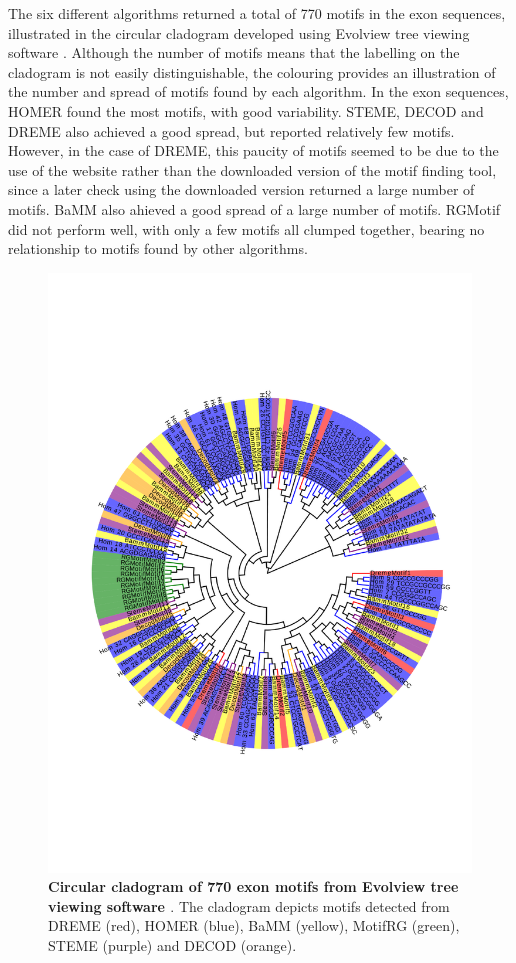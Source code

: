 \documentclass[12pt]{article}
\begin{document}
The six different algorithms returned a total of 770 motifs in the exon sequences, illustrated in the circular cladogram developed using Evolview tree viewing software  \citep{He2016}. Although the number of motifs means that the labelling on the cladogram is not easily distinguishable, the colouring provides an illustration of the number and spread of motifs found by each algorithm. In the exon sequences, HOMER found the most motifs, with good variability. STEME, DECOD and DREME also achieved a good spread, but reported relatively few motifs. However, in the case of DREME, this paucity of motifs seemed to be due to the use of the website rather than the downloaded version of the motif finding tool, since a later check using the downloaded version returned a large number of motifs. BaMM also ahieved a good spread of a large number of motifs. RGMotif did not perform well, with only a few motifs all clumped together, bearing no relationship to motifs found by other algorithms.

\begin{figure}[htbp] 
     \includegraphics[width= \textwidth]{exon_pilot_cardiogram.pdf} 
    \caption{{\bf Circular cladogram of 770 exon motifs from Evolview tree viewing software \citep{he2016evolview} }. 
    The cladogram depicts motifs detected from DREME (red), HOMER (blue), BaMM (yellow), MotifRG (green), STEME (purple)
    and DECOD (orange). }
    \label{fig: exon_cladogram}
\end{figure}
\end{document}
